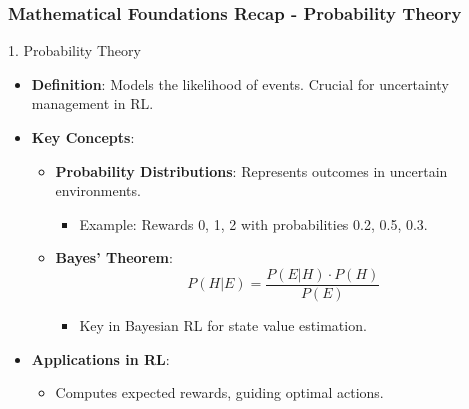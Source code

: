 \documentclass[aspectratio=169]{beamer}
\begin{document}
\begin{frame}[fragile]
    \frametitle{Mathematical Foundations Recap - Probability Theory}
    \begin{block}{1. Probability Theory}
        \begin{itemize}
            \item \textbf{Definition}: Models the likelihood of events. Crucial for uncertainty management in RL.
            \item \textbf{Key Concepts}:
            \begin{itemize}
                \item \textbf{Probability Distributions}: Represents outcomes in uncertain environments.
                \begin{itemize}
                    \item Example: Rewards {0, 1, 2} with probabilities {0.2, 0.5, 0.3}.
                \end{itemize}
                \item \textbf{Bayes' Theorem}:
                \begin{equation}
                P(H|E) = \frac{P(E|H) \cdot P(H)}{P(E)}
                \end{equation}
                \begin{itemize}
                    \item Key in Bayesian RL for state value estimation.
                \end{itemize}
            \end{itemize}
            \item \textbf{Applications in RL}: 
            \begin{itemize}
                \item Computes expected rewards, guiding optimal actions.
            \end{itemize}
        \end{itemize}
    \end{block}
\end{frame}
\end{document}
